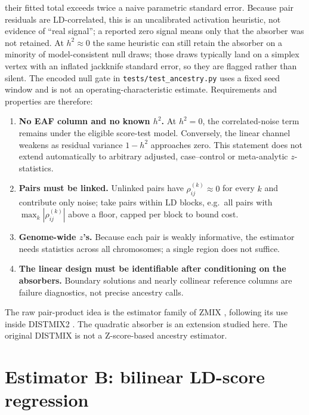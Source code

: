 \documentclass[11pt,a4paper]{article}
\newcommand{\Rho}{\rho}
\begin{document}
their fitted total exceeds twice a naive parametric standard error. Because
pair residuals are LD-correlated, this is an uncalibrated activation
heuristic, not evidence of ``real signal''; a reported zero signal means
only that the absorber was not retained. At $h^2\approx 0$ the same
heuristic can still retain the absorber on a minority of
model-consistent null draws; those draws typically land on a simplex
vertex with an inflated jackknife standard error, so they are flagged
rather than silent. The encoded null gate in
\texttt{tests/test\_ancestry.py} uses a fixed seed window and is not an
operating-characteristic estimate. Requirements and properties are
therefore:
\begin{enumerate}[itemsep=2pt]
  \item \textbf{No EAF column and no known $h^2$.} At $h^2=0$, the
        correlated-noise term remains under the eligible score-test model.
        Conversely, the linear channel weakens as residual variance
        $1-h^2$ approaches zero.
        This statement does not extend automatically to arbitrary adjusted,
        case--control or meta-analytic $z$-statistics.
  \item \textbf{Pairs must be linked.} Unlinked pairs have
        $\Rho^{(k)}_{ij} \approx 0$ for every $k$ and contribute only
        noise; take pairs within LD blocks, e.g.\ all pairs with
        $\max_k | \Rho^{(k)}_{ij} |$ above a floor, capped per block to
        bound cost.
  \item \textbf{Genome-wide $z$'s.} Because each pair is weakly
        informative, the estimator needs statistics across all chromosomes;
        a single region does not suffice.
  \item \textbf{The linear design must be identifiable after conditioning
        on the absorbers.} Boundary solutions and nearly collinear reference
        columns are failure diagnostics, not precise ancestry calls.
\end{enumerate}
The raw pair-product idea is the estimator family of ZMIX
\citep{dennis2024zmix}, following its use inside DISTMIX2
\citep{chatzinakos2021distmix2}. The quadratic absorber is an extension
studied here. The original DISTMIX \citep{lee2015distmix} is not a
Z-score-based ancestry estimator.

\section{Estimator B: bilinear LD-score regression}\label{sec:bilinear}
\end{document}
